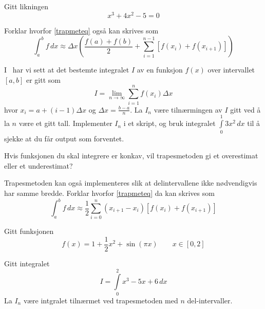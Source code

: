 





\opgt


\nes
{}
Gitt likningen
\[ x^3+4x^2-5=0 \]

\nes

Forklar hvorfor \eqref{trapmeteq} også kan skrives som
\[ \int_{a}^{b} f\,dx \approx \Delta x\left(\frac{f(a)+f(b)}{2}+\sum_{i=1}^{n-1}\left[f(x_i)+f(x_{i+1})\right]\right)  \]

I \tmto\ har vi sett at det bestemte integralet $ I $ av en funksjon $ f(x) $ over intervallet $ [a, b] $ er gitt som
\begin{equation}
	I= \lim\limits_{n\to \infty}\sum\limits_{i=1}^{n} f(x_{i})\Delta x 
\end{equation}
hvor $ {x_i=a+(i-1)\Delta x}$ og $ {\Delta x=\frac{b-a}{n}} $. La $ I_n $ være tilnærmingen av $ I $ gitt ved å la $ n $ være et gitt tall. Implementer $ I_n $ i et skript, og bruk integralet $ \int\limits_{0}^1 3x^2\,dx $ til å sjekke at du får output som forventet.

Hvis funksjonen du skal integrere er konkav, vil trapesmetoden gi et overestimat eller et underestimat?

\newpage
{}
Trapesmetoden kan også implementeres slik at delintervallene ikke nødvendigvis har samme bredde. Forklar hvorfor \eqref{trapmeteq} da kan skrives som
\[ \int_{a}^{b} f\,dx \approx \frac{1}{2}\sum_{i=0}^{n} (x_{i+1}-x_i)\left[f(x_i)+f(x_{i+1})\right]  \]

Gitt funksjonen 
\[ f(x)= 1+\frac{1}{2}x^2+\sin(\pi x) \qquad x\in [0, 2]\]

Gitt integralet
\[ I=\int\limits_0^2 x^3-5x+6\,dx\]
La $ I_n $ være intgralet tilnærmet ved trapesmetoden med $ n $ del-intervaller.
